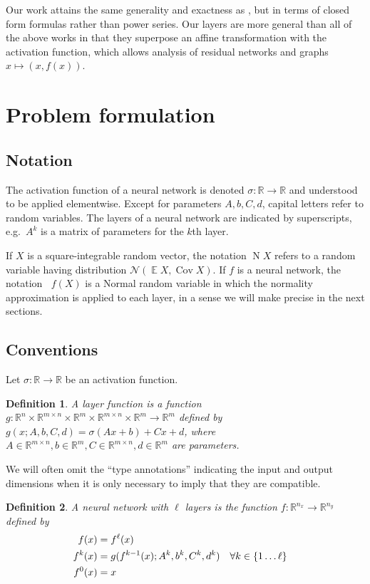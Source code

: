 \documentclass{article}
\newtheorem{definition}{Definition}
\DeclareMathOperator{\expect}{\mathbb{E}}
\DeclareMathOperator{\Cov}{\operatorname{Cov}}
\DeclareMathOperator{\normal}{\mathrm N}
\DeclareMathOperator{\Normal}{\mathrm N^*}
\begin{document}
Our work attains the same generality and exactness as \citet{wright_analytic_2024}, but in terms of closed form formulas rather than power series.
Our layers are more general than all of the above works in that they superpose an affine transformation with the activation function, which allows analysis of residual networks and graphs \(x \mapsto (x, f(x))\).

\section{Problem formulation}
\subsection{Notation}
The activation function of a neural network is denoted \(\sigma:\mathbb R \to \mathbb R\) and understood to be applied elementwise.
Except for parameters \(A, b, C, d\), capital letters refer to random variables.
The layers of a neural network are indicated by superscripts, e.g.~\(A^k\) is a matrix of parameters for the \(k\)th layer.

If \(X\) is a square-integrable random vector, the notation \(\normal X\) refers to a random variable having distribution \(\mathcal N(\expect X, \Cov X)\).
If \(f\) is a neural network, the notation \(\Normal f(X)\) is a Normal random variable in which the normality approximation is applied to each layer, in a sense we will make precise in the next sections.

\subsection{Conventions}
Let \(\sigma : \mathbb R \to \mathbb R\) be an activation function.

\begin{definition}
    \label{def:layer-function}
    A layer function is a function \(g:\mathbb R^n \times \mathbb R^{m \times n} \times \mathbb R^m \times \mathbb R^{m \times n} \times \mathbb R^m \to \mathbb R^m\) defined by \(g(x; A, b, C, d) = \sigma(A x + b) + C x + d\), where \(A \in \mathbb R^{m \times n}, b \in \mathbb R^m, C \in \mathbb R^{m \times n}, d \in \mathbb R^m\) are parameters.
\end{definition}

We will often omit the ``type annotations'' indicating the input and output dimensions when it is only necessary to imply that they are compatible.

\begin{definition}
    \label{def:neural-network}
    A neural network with \(\ell \) layers is the function \(f: \mathbb R^{n_x} \to \mathbb R^{n_y}\) defined by
    \begin{align*}
        f(x) &= f^\ell(x) \\
        f^k(x) &= g(f^{k-1}(x); A^k, b^k, C^k, d^k) & \forall k &\in \cbr{1 \ldots \ell} \\
        f^0(x) &= x
    \end{align*}
\end{definition}
\end{document}
